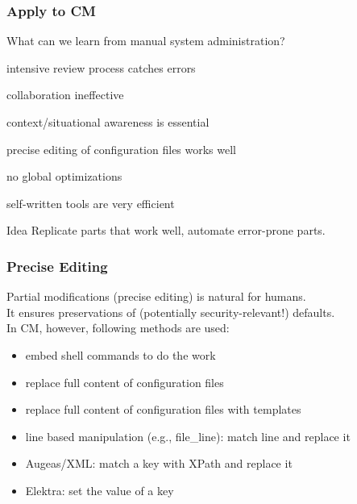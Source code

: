 \begin{frame}
	\frametitle{Apply to CM}

	What can we learn from manual system administration?

	\begin{description}[<+-| alert@+>] %
	\item[$+$] intensive review process catches errors
	\item[$-$] collaboration ineffective
	\item[$-$] context/situational awareness is essential
	\item[$+$] precise editing of configuration files works well
	\item[$-$] no global optimizations
	\item[$+$] self-written tools are very efficient
	\end{description}

	\begin{alertblock}{Idea}
	Replicate parts that work well, automate error-prone parts.
	\end{alertblock}
\end{frame}

\begin{frame}
	\frametitle{Precise Editing}

	Partial modifications (precise editing) is natural for humans. \\
	It ensures preservations of (potentially security-relevant!) defaults. \\
	In CM, however, following methods are used:

	\begin{itemize}[<+-| alert@+>] %
	\item embed shell commands to do the work
	\item replace full content of configuration files
	\item replace full content of configuration files with templates
	\item line based manipulation (e.g., file\_line): match line and replace it
	\item Augeas/XML: match a key with XPath and replace it
	\item Elektra: set the value of a key
	\end{itemize}
\end{frame}

